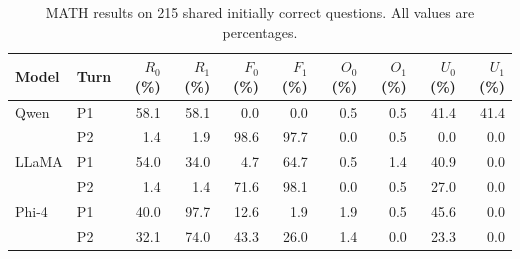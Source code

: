 \begin{table}[!ht]
\centering
\small
\setlength{\tabcolsep}{2.2pt}
\caption{MATH results on 215 shared initially correct
questions. All values are percentages.}
\label{tab:math-results}

\begin{tabular}{@{}llrrrrrrrr@{}}
\toprule
Model & Turn
& $R_0$ (\%) & $R_1$ (\%)
& $F_0$ (\%) & $F_1$ (\%)
& $O_0$ (\%) & $O_1$ (\%)
& $U_0$ (\%) & $U_1$ (\%) \\
\midrule
Qwen & P1
& 58.1 & 58.1 & 0.0 & 0.0
& 0.5 & 0.5 & 41.4 & 41.4 \\
& P2
& 1.4 & 1.9 & 98.6 & 97.7
& 0.0 & 0.5 & 0.0 & 0.0 \\

\addlinespace
LLaMA & P1
& 54.0 & 34.0 & 4.7 & 64.7
& 0.5 & 1.4 & 40.9 & 0.0 \\
& P2
& 1.4 & 1.4 & 71.6 & 98.1
& 0.0 & 0.5 & 27.0 & 0.0 \\

\addlinespace
Phi-4 & P1
& 40.0 & 97.7 & 12.6 & 1.9
& 1.9 & 0.5 & 45.6 & 0.0 \\
& P2
& 32.1 & 74.0 & 43.3 & 26.0
& 1.4 & 0.0 & 23.3 & 0.0 \\
\bottomrule
\end{tabular}
\end{table}
